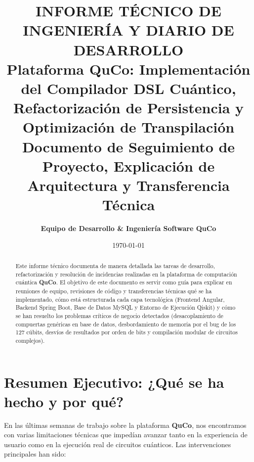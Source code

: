 \documentclass[11pt,a4paper]{article}
\title{
    \vspace{-1.5cm}
    \textbf{\Large INFORME TÉCNICO DE INGENIERÍA Y DIARIO DE DESARROLLO}\\[0.3cm]
    \textbf{\LARGE Plataforma QuCo: Implementación del Compilador DSL Cuántico, Refactorización de Persistencia y Optimización de Transpilación}\\[0.4cm]
    \large Documento de Seguimiento de Proyecto, Explicación de Arquitectura y Transferencia Técnica
}
\author{\textbf{Equipo de Desarrollo \& Ingeniería Software QuCo}}
\date{\today}
\begin{document}
\maketitle

\begin{abstract}
Este informe técnico documenta de manera detallada las tareas de desarrollo, refactorización y resolución de incidencias realizadas en la plataforma de computación cuántica \textbf{QuCo}. El objetivo de este documento es servir como guía para explicar en reuniones de equipo, revisiones de código y transferencias técnicas qué se ha implementado, cómo está estructurada cada capa tecnológica (Frontend Angular, Backend Spring Boot, Base de Datos MySQL y Entorno de Ejecución Qiskit) y cómo se han resuelto los problemas críticos de negocio detectados (desacoplamiento de compuertas genéricas en base de datos, desbordamiento de memoria por el bug de los 127 cúbits, desvíos de resultados por orden de bits y compilación modular de circuitos complejos).
\end{abstract}

\tableofcontents
\newpage

\section{Resumen Ejecutivo: ¿Qué se ha hecho y por qué?}

En las últimas semanas de trabajo sobre la plataforma \textbf{QuCo}, nos encontramos con varias limitaciones técnicas que impedían avanzar tanto en la experiencia de usuario como en la ejecución real de circuitos cuánticos. Las intervenciones principales han sido:
\end{document}
